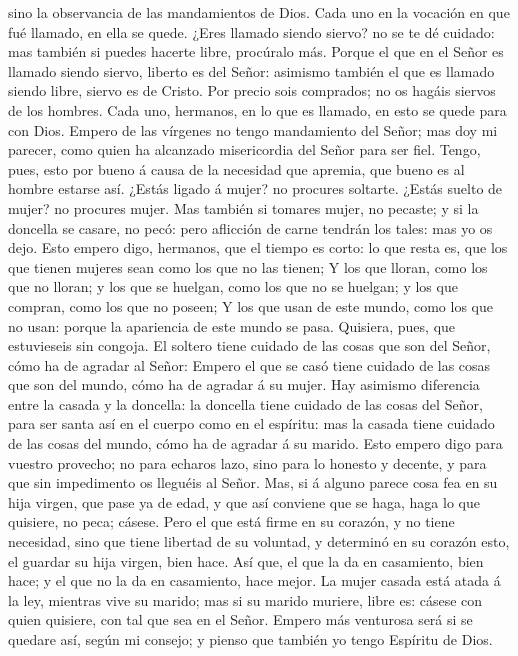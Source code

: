sino la observancia de las mandamientos de Dios.  Cada
uno en la vocación en que fué llamado, en ella se quede. 
¿Eres llamado siendo siervo? no se te dé cuidado: mas también si puedes
hacerte libre, procúralo más.  Porque el que en el Señor
es llamado siendo siervo, liberto es del Señor: asimismo también el que
es llamado siendo libre, siervo es de Cristo.  Por precio
sois comprados; no os hagáis siervos de los hombres. 
Cada uno, hermanos, en lo que es llamado, en esto se quede para con
Dios.  Empero de las vírgenes no tengo mandamiento del
Señor; mas doy mi parecer, como quien ha alcanzado misericordia del
Señor para ser fiel.  Tengo, pues, esto por bueno á causa
de la necesidad que apremia, que bueno es al hombre estarse así.
 ¿Estás ligado á mujer? no procures soltarte. ¿Estás
suelto de mujer? no procures mujer.  Mas también si
tomares mujer, no pecaste; y si la doncella se casare, no pecó: pero
aflicción de carne tendrán los tales: mas yo os dejo. 
Esto empero digo, hermanos, que el tiempo es corto: lo que resta es, que
los que tienen mujeres sean como los que no las tienen; 
Y los que lloran, como los que no lloran; y los que se huelgan, como los
que no se huelgan; y los que compran, como los que no poseen;
 Y los que usan de este mundo, como los que no usan:
porque la apariencia de este mundo se pasa.  Quisiera,
pues, que estuvieseis sin congoja. El soltero tiene cuidado de las cosas
que son del Señor, cómo ha de agradar al Señor:  Empero
el que se casó tiene cuidado de las cosas que son del mundo, cómo ha de
agradar á su mujer.  Hay asimismo diferencia entre la
casada y la doncella: la doncella tiene cuidado de las cosas del Señor,
para ser santa así en el cuerpo como en el espíritu: mas la casada tiene
cuidado de las cosas del mundo, cómo ha de agradar á su marido.
 Esto empero digo para vuestro provecho; no para echaros
lazo, sino para lo honesto y decente, y para que sin impedimento os
lleguéis al Señor.  Mas, si á alguno parece cosa fea en
su hija virgen, que pase ya de edad, y que así conviene que se haga,
haga lo que quisiere, no peca; cásese.  Pero el que está
firme en su corazón, y no tiene necesidad, sino que tiene libertad de su
voluntad, y determinó en su corazón esto, el guardar su hija virgen,
bien hace.  Así que, el que la da en casamiento, bien
hace; y el que no la da en casamiento, hace mejor.  La
mujer casada está atada á la ley, mientras vive su marido; mas si su
marido muriere, libre es: cásese con quien quisiere, con tal que sea en
el Señor.  Empero más venturosa será si se quedare así,
según mi consejo; y pienso que también yo tengo Espíritu de Dios.

